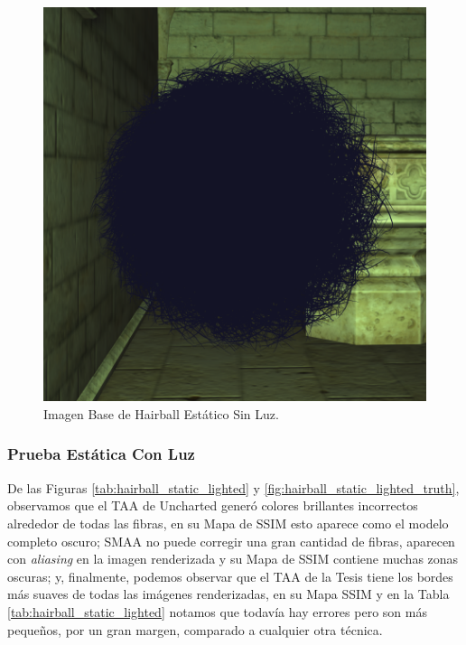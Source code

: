 \documentclass[pregrado]{tesis-usb} %
\begin{document}
\begin{figure}[!htb]
	\centering
	\includegraphics[scale=0.3]{images/results/hairball_sobel_ground_truth.png}
	\caption{Imagen Base de Hairball Estático Sin Luz.}\label{fig:hairball_static_shadow_truth}
\end{figure}

\FloatBarrier

\subsubsection{Prueba Estática Con Luz}
De las Figuras \ref{tab:hairball_static_lighted} y \ref{fig:hairball_static_lighted_truth}, observamos que el TAA de Uncharted generó colores brillantes incorrectos alrededor de todas las fibras, en su Mapa de SSIM esto aparece como el modelo completo oscuro; SMAA no puede corregir una gran cantidad de fibras, aparecen con \textit{aliasing} en la imagen renderizada y su Mapa de SSIM contiene muchas zonas oscuras; y, finalmente, podemos observar que el TAA de la Tesis tiene los bordes más suaves de todas las imágenes renderizadas, en su Mapa SSIM y en la Tabla \ref{tab:hairball_static_lighted} notamos que todavía hay errores pero son más pequeños, por un gran margen, comparado a cualquier otra técnica.
\end{document}
